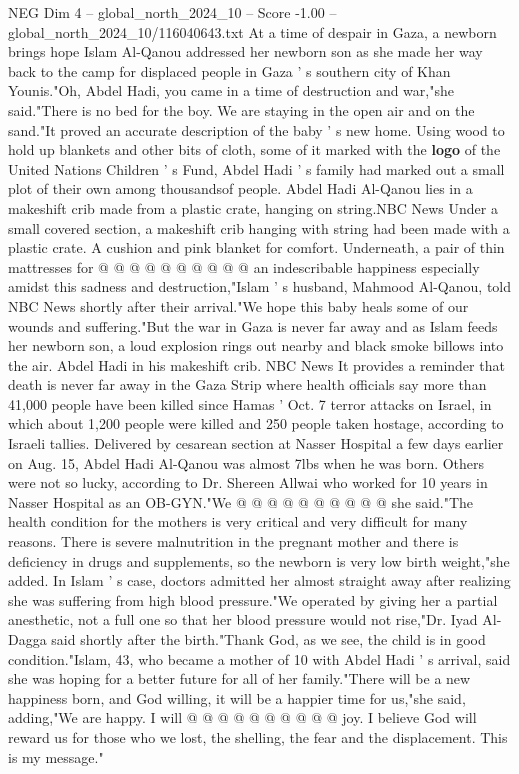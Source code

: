 \begin{textsample}{NEG Dim 4 – global\_north\_2024\_10 – Score -1.00 – global\_north\_2024\_10/116040643.txt}  \label{ex:f4_neg_053}
At a time of despair in Gaza, a newborn brings hope Islam Al-Qanou addressed her newborn son as she made her way back to the camp for displaced people in Gaza ' s southern city of Khan Younis."Oh, Abdel Hadi, you came in a time of destruction and war,"she said."There is no bed for the boy.
We are staying in the open air and on the sand."It proved an accurate description of the baby ' s new home.
Using wood to hold up blankets and other bits of cloth, some of it marked with the \textbf{logo} of the United Nations Children ' s Fund, Abdel Hadi ' s family had marked out a small plot of their own among thousandsof people.
Abdel Hadi Al-Qanou lies in a makeshift crib made from a plastic crate, hanging on string.NBC News Under a small covered section, a makeshift crib hanging with string had been made with a plastic crate.
A cushion and pink blanket for comfort.
Underneath, a pair of thin mattresses for @ @ @ @ @ @ @ @ @ @ an indescribable happiness especially amidst this sadness and destruction,"Islam ' s husband, Mahmood Al-Qanou, told NBC News shortly after their arrival."We hope this baby heals some of our wounds and suffering."But the war in Gaza is never far away and as Islam feeds her newborn son, a loud explosion rings out nearby and black smoke billows into the air.
Abdel Hadi in his makeshift crib.
NBC News It provides a reminder that death is never far away in the Gaza Strip where health officials say more than 41,000 people have been killed since Hamas ' Oct. 7 terror attacks on Israel, in which about 1,200 people were killed and 250 people taken hostage, according to Israeli tallies.
Delivered by cesarean section at Nasser Hospital a few days earlier on Aug. 15, Abdel Hadi Al-Qanou was almost 7lbs when he was born.
Others were not so lucky, according to Dr.
Shereen Allwai who worked for 10 years in Nasser Hospital as an OB-GYN."We @ @ @ @ @ @ @ @ @ @ she said."The health condition for the mothers is very critical and very difficult for many reasons.
There is severe malnutrition in the pregnant mother and there is deficiency in drugs and supplements, so the newborn is very low birth weight,"she added.
In Islam ' s case, doctors admitted her almost straight away after realizing she was suffering from high blood pressure."We operated by giving her a partial anesthetic, not a full one so that her blood pressure would not rise,"Dr.
Iyad Al-Dagga said shortly after the birth."Thank God, as we see, the child is in good condition."Islam, 43, who became a mother of 10 with Abdel Hadi ' s arrival, said she was hoping for a better future for all of her family."There will be a new happiness born, and God willing, it will be a happier time for us,"she said, adding,"We are happy.
I will @ @ @ @ @ @ @ @ @ @ joy.
I believe God will reward us for those who we lost, the shelling, the fear and the displacement.
This is my message."

\end{textsample}
